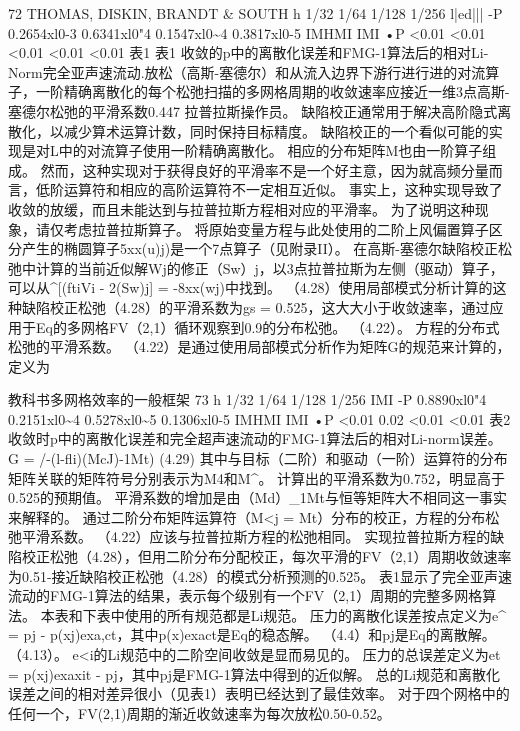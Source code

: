 \documentclass[UTF8,11pt,a4paper,openany,fontset=fandol]{ctexbook}
\begin{document}
72 THOMAS, DISKIN, BRANDT \& SOUTH h 1/32 1/64 1/128 1/256 l|ed||| -P 0.2654xl0-3 0.6341xl0"4 0.1547xl0\textasciitilde{}4 0.3817xl0-5 IMHMI IMI •P <0.01 <0.01 <0.01 <0.01 <0.01 表1 表1 收敛的p中的离散化误差和FMG-1算法后的相对Li-Norm完全亚声速流动.放松（高斯-塞德尔）和从流入边界下游行进行进的对流算子，一阶精确离散化的每个松弛扫描的多网格周期的收敛速率应接近一维3点高斯-塞德尔松弛的平滑系数0.447 拉普拉斯操作员。 缺陷校正通常用于解决高阶隐式离散化，以减少算术运算计数，同时保持目标精度。 缺陷校正的一个看似可能的实现是对L中的对流算子使用一阶精确离散化。 相应的分布矩阵M也由一阶算子组成。 然而，这种实现对于获得良好的平滑率不是一个好主意，因为就高频分量而言，低阶运算符和相应的高阶运算符不一定相互近似。 事实上，这种实现导致了收敛的放缓，而且未能达到与拉普拉斯方程相对应的平滑率。 为了说明这种现象，请仅考虑拉普拉斯算子。 将原始变量方程与此处使用的二阶上风偏置算子区分产生的椭圆算子5xx(u)j)是一个7点算子（见附录II）。 在高斯-塞德尔缺陷校正松弛中计算的当前近似解Wj的修正（Sw）j，以3点拉普拉斯为左侧（驱动）算子，可以从\textasciicircum{}[(ftiVi - 2(Sw)j] = -8xx(wj)中找到。 （4.28）使用局部模式分析计算的这种缺陷校正松弛（4.28）的平滑系数为gs = 0.525，这大大小于收敛速率，通过应用于Eq的多网格FV（2,1）循环观察到0.9的分布松弛。 （4.22）。 方程的分布式松弛的平滑系数。 （4.22）是通过使用局部模式分析作为矩阵G的规范来计算的，定义为

教科书多网格效率的一般框架 73 h 1/32 1/64 1/128 1/256 IMI -P 0.8890xl0"4 0.2151xl0\textasciitilde{}4 0.5278xl0\textasciitilde{}5 0.1306xl0-5 IMHMI IMI •P <0.01 0.02 <0.01 <0.01 表2 收敛时p中的离散化误差和完全超声速流动的FMG-1算法后的相对Li-norm误差。 G = /-(l-fli)(McJ)-1Mt) (4.29) 其中与目标（二阶）和驱动（一阶）运算符的分布矩阵关联的矩阵符号分别表示为M4和M\textasciicircum{}。 计算出的平滑系数为0.752，明显高于0.525的预期值。 平滑系数的增加是由（Md）\_1Mt与恒等矩阵大不相同这一事实来解释的。 通过二阶分布矩阵运算符（M<j = Mt）分布的校正，方程的分布松弛平滑系数。 （4.22）应该与拉普拉斯方程的松弛相同。 实现拉普拉斯方程的缺陷校正松弛（4.28），但用二阶分布分配校正，每次平滑的FV（2,1）周期收敛速率为0.51-接近缺陷校正松弛（4.28）的模式分析预测的0.525。 表1显示了完全亚声速流动的FMG-1算法的结果，表示每个级别有一个FV（2,1）周期的完整多网格算法。 本表和下表中使用的所有规范都是Li规范。 压力的离散化误差按点定义为e\textasciicircum{} = pj - p(xj)exa,ct，其中p(x)exact是Eq的稳态解。 （4.4）和pj是Eq的离散解。 （4.13）。 e<i的Li规范中的二阶空间收敛是显而易见的。 压力的总误差定义为et = p(xj)exaxit - pj，其中pj是FMG-1算法中得到的近似解。 总的Li规范和离散化误差之间的相对差异很小（见表1）表明已经达到了最佳效率。 对于四个网格中的任何一个，FV(2,1)周期的渐近收敛速率为每次放松0.50-0.52。
\end{document}
